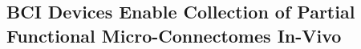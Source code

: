 \documentclass[11pt]{article}
\newcommand{\subsectionwithindent}[1]{
    \subsection*{#1}
    \hspace{\parindent} %
}
\begin{document}
\subsectionwithindent{BCI Devices Enable Collection of Partial Functional Micro-Connectomes In-Vivo}
\end{document}
